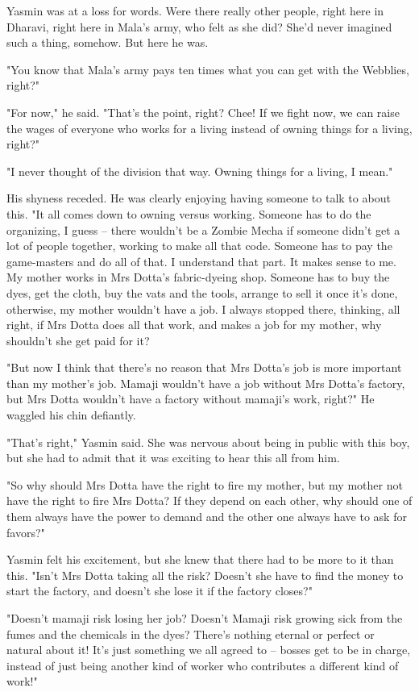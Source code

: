 Yasmin was at a loss for words. Were there really other people,
right here in Dharavi, right here in Mala's army, who felt as she
did? She'd never imagined such a thing, somehow. But here he was.

"You know that Mala's army pays ten times what you can get with the
Webblies, right?"

"For now," he said. "That's the point, right? Chee! If we fight
now, we can raise the wages of everyone who works for a living
instead of owning things for a living, right?"

"I never thought of the division that way. Owning things for a
living, I mean."

His shyness receded. He was clearly enjoying having someone to talk
to about this. "It all comes down to owning versus working. Someone
has to do the organizing, I guess -- there wouldn't be a Zombie
Mecha if someone didn't get a lot of people together, working to
make all that code. Someone has to pay the game-masters and do all
of that. I understand that part. It makes sense to me. My mother
works in Mrs Dotta's fabric-dyeing shop. Someone has to buy the
dyes, get the cloth, buy the vats and the tools, arrange to sell it
once it's done, otherwise, my mother wouldn't have a job. I always
stopped there, thinking, all right, if Mrs Dotta does all that
work, and makes a job for my mother, why shouldn't she get paid for
it?

"But now I think that there's no reason that Mrs Dotta's job is
more important than my mother's job. Mamaji wouldn't have a job
without Mrs Dotta's factory, but Mrs Dotta wouldn't have a factory
without mamaji's work, right?" He waggled his chin defiantly.

"That's right," Yasmin said. She was nervous about being in public
with this boy, but she had to admit that it was exciting to hear
this all from him.

"So why should Mrs Dotta have the right to fire my mother, but my
mother not have the right to fire Mrs Dotta? If they depend on each
other, why should one of them always have the power to demand and
the other one always have to ask for favors?"

Yasmin felt his excitement, but she knew that there had to be more
to it than this. "Isn't Mrs Dotta taking all the risk? Doesn't she
have to find the money to start the factory, and doesn't she lose
it if the factory closes?"

"Doesn't mamaji risk losing her job? Doesn't Mamaji risk growing
sick from the fumes and the chemicals in the dyes? There's nothing
eternal or perfect or natural about it! It's just something we all
agreed to -- bosses get to be in charge, instead of just being
another kind of worker who contributes a different kind of work!"

